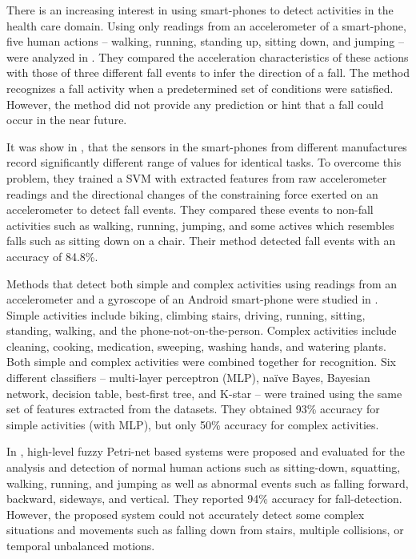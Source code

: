 \documentclass[]{IEEEtran}
\begin{document}
There is an increasing interest in using smart-phones to detect activities in the
health care domain. Using only readings from an accelerometer of a
smart-phone,  five human actions -- walking, running, standing up, sitting
down, and jumping  -- were analyzed in \cite{baiFallDetectionPhone2013}. They
compared the acceleration characteristics of these actions with  those of three
different fall events to infer the direction of a fall. The method recognizes a
fall activity when a predetermined set of conditions were satisfied. However,
the method did not provide any prediction or hint that a fall could occur in
the near future. 

It was show in \cite{steidlFallDetection2012}, that the sensors in the
smart-phones from different manufactures record significantly different range of
values for identical tasks.  To overcome this problem, they trained a SVM with
extracted features from raw accelerometer readings and the directional changes
of the constraining force exerted on an accelerometer to detect fall events.
They compared these events to non-fall activities such as walking, running,
jumping, and some actives which resembles falls such as sitting down on a
chair. Their method detected fall events with an accuracy of 84.8\%. 

Methods that detect both simple and complex activities using readings from
an accelerometer and a gyroscope of an Android smart-phone were studied
in \cite{DernbachActivityAndFallDetectionPhone2012}. Simple activities
include biking, climbing stairs, driving, running, sitting, standing,
walking, and the phone-not-on-the-person. Complex activities include
cleaning, cooking, medication, sweeping, washing hands, and watering plants. Both
simple and complex activities were combined together for recognition. Six different classifiers 
-- multi-layer  perceptron (MLP), na\"{i}ve  Bayes,  Bayesian  network,  decision
table,  best-first tree, and  K-star --  were trained using  the same set of
features extracted from the datasets. They obtained 93\% accuracy for simple
activities (with MLP), but only 50\% accuracy for complex activities.    

In \cite{ShenFallDetectionPhone2015}, high-level fuzzy Petri-net based systems
were proposed and evaluated for the analysis and detection of normal human
actions such as sitting-down, squatting, walking, running, and jumping as well
as abnormal events such as falling forward, backward, sideways, and vertical.
They reported 94\% accuracy for fall-detection. However, the proposed system  could
not accurately detect some complex situations and movements  such as falling
down from  stairs, multiple collisions, or temporal unbalanced motions.
\end{document}
